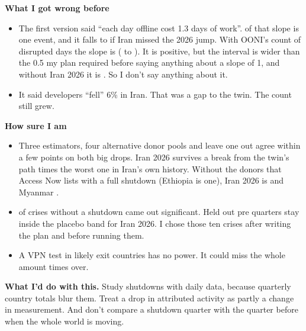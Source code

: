 \documentclass[11pt]{article}
\begin{document}
\vspace{4pt}
\textbf{What I got wrong before}
\begin{itemize}
\item The first version said ``each day offline cost 1.3 days of work''. \doseinfluence{} of that slope is one event, and it falls to \doseflat{} if Iran missed the 2026 jump. With OONI's count of disrupted days the slope is \cthreebeta{} (\cthreelo{} to \cthreehi). It is positive, but the interval is wider than the 0.5 my plan required before saying anything about a slope of 1, and without Iran 2026 it is \cthreewithout. So I don't say anything about it.
\item It said developers ``fell'' 6\% in Iran. That was a gap to the twin. The count still grew.
\end{itemize}

\textbf{How sure I am}
\begin{itemize}
\item Three estimators, four alternative donor pools and leave one out agree within a few points on both big drops. Iran 2026 survives a break from the twin's path \bdmIRc{} times the worst one in Iran's own history. Without the \nkioexcluded{} donors that Access Now lists with a full shutdown (Ethiopia is one), Iran 2026 is \poolpctIRc{} and Myanmar \poolpctMM.
\item \ncrej{} of \ncn{} crises without a shutdown came out significant. Held out pre quarters stay inside the placebo band for Iran 2026. I chose those ten crises after writing the plan and before running them.
\item A VPN test in likely exit countries has no power. It could miss the whole amount \vpnmde{} times over.
\end{itemize}

\textbf{What I'd do with this.} Study shutdowns with daily data, because quarterly country totals blur them. Treat a drop in attributed activity as partly a change in measurement. And don't compare a shutdown quarter with the quarter before when the whole world is moving.
\end{document}
